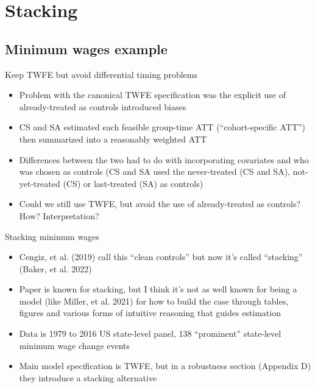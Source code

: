 \documentclass{beamer}
\begin{document}



\section{Stacking}

\subsection{Minimum wages example}


\begin{frame}{Keep TWFE but avoid differential timing problems}

\begin{itemize}
\item Problem with the canonical TWFE specification was the explicit use of already-treated as controls introduced biases
\item CS and SA estimated each feasible group-time ATT (``cohort-specific ATT'') then summarized into a reasonably weighted ATT
\item Differences between the two had to do with incorporating covariates and who was chosen as controls (CS and SA used the never-treated (CS and SA), not-yet-treated (CS) or last-treated (SA) as controls)
\item Could we still use TWFE, but avoid the use of already-treated as controls?  How? Interpretation?
\end{itemize}

\end{frame}


\begin{frame}{Stacking minimum wages}

\begin{itemize}
\item  Cengiz, et al. (2019) call this ``clean controls'' but now it's called ``stacking'' (Baker, et al. 2022)
\item Paper is known for stacking, but I think it's not as well known for being a model (like Miller, et al. 2021) for how to build the case through tables, figures and various forms of intuitive reasoning that guides estimation
\item Data is 1979 to 2016 US state-level panel, 138 ``prominent'' state-level minimum wage change events
\item Main model specification is TWFE, but in a robustness section (Appendix D) they introduce a stacking alternative
\end{itemize}

\end{frame}
\end{document}
